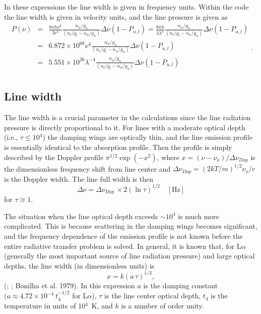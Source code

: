 In these expressions the line width is given in frequency units.  Within
the code the line width is given in velocity units, and the line pressure
is given as
\begin{equation}
\begin{array}{ccl}
P(\nu)&=& \frac{8\pi h\nu^4}{3c^4} \frac{n_u/g_u}{(n_l/g_l-n_u/g_u)} \Delta
\nu (1-P_{u,l})= \frac{8\pi h}{3\lambda^4}
\frac{n_u/g_u}{(n_l/g_l-n_u/g_u)} \Delta \nu (1-P_{u,l})\\
&=& 6.872\times 10^{68}\nu^4 \frac{n_u/g_u}{(n_l/g_l-n_u/g_u)}
\Delta\nu (1-P_{u,l})\\
&=&5.551\times
10^{26}\lambda^{-4}\frac{n_u/g_u}{(n_l/g_l-n_u/g_u)}\Delta\nu (1-P_{u,l})\\
\end{array}.
\end{equation}

\subsection{Line width}

The line width is a crucial parameter in the calculations since the line
radiation pressure is directly proportional to it.  For lines with a moderate
optical depth (i.e., $\tau\le  10^4$) the damping wings are optically thin, and the
line emission profile is essentially identical to the absorption profile.
Then the profile is simply described by the Doppler profile ${\pi ^{1/2}}\exp \left(
{ - {x^2}} \right)$, where $x=(\nu-\nu_o)/\Delta\nu_{Dop}$ is the dimensionless frequency shift from line center
and $\Delta \nu_{Dop} = (2kT/m)^{1/2} \nu_o/c$ is the Doppler width.  The line full width is then
\begin{equation}
\Delta \nu  = \Delta {\nu _{Dop}}\, \times 2{\left( {\ln \tau }
\right)^{1/2}}
\quad [\mathrm{Hz}]
\end{equation}
for $\tau \cong  1$.

The situation when the line optical depth exceeds  $\sim10^4$ is much more
complicated.  This is because scattering in the damping wings becomes
significant, and the frequency dependence of the emission profile is not
known before the entire radiative transfer problem is solved.  In general,
it is known that, for L$\alpha $ (generally the most important source of line
radiation pressure) and large optical depths, the line width (in
dimensionless units) is
\begin{equation}
x = k{\left( {a\,\tau } \right)^{1/3}},
\end{equation}
 (\citealp{Adams1972}; \citealp{Harrington1973}; Bonilha et al. 1979).  In this expression
$a$ is the damping constant $(a \approx 4.72\times 10^{-4}\ t_4^{ - 1/2}$
for L$\alpha $), $\tau$ is the line center optical depth, $t_4$ is the temperature in units
of 10$^4$~K, and $k$ is a number of order unity.

